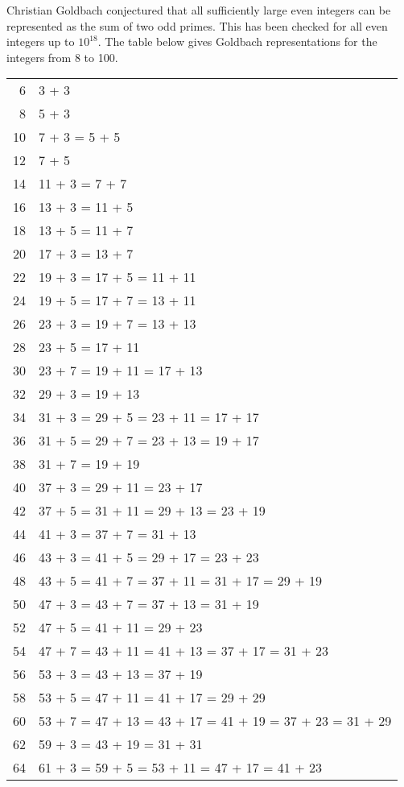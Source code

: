 \documentclass[12pt]{article}
\begin{document}
Christian Goldbach conjectured that all sufficiently large even integers can be represented as the sum of two odd primes. This has been checked for all even integers up to $10^{18}$. The table below gives Goldbach representations for the integers from 8 to 100.

\begin{tabular}{|r|l|}
6 & 3 + 3 \\
8 & 5 + 3 \\
10 & 7 + 3 = 5 + 5 \\
12 & 7 + 5 \\
14 & 11 + 3 = 7 + 7 \\
16 & 13 + 3 = 11 + 5 \\
18 & 13 + 5 = 11 + 7 \\
20 & 17 + 3 = 13 + 7 \\
22 & 19 + 3 = 17 + 5 = 11 + 11 \\
24 & 19 + 5 = 17 + 7 = 13 + 11 \\
26 & 23 + 3 = 19 + 7 = 13 + 13 \\
28 & 23 + 5 = 17 + 11 \\
30 & 23 + 7 = 19 + 11 = 17 + 13 \\
32 & 29 + 3 = 19 + 13 \\
34 & 31 + 3 = 29 + 5 = 23 + 11 = 17 + 17 \\
36 & 31 + 5 = 29 + 7 = 23 + 13 = 19 + 17 \\
38 & 31 + 7 = 19 + 19 \\
40 & 37 + 3 = 29 + 11 = 23 + 17 \\
42 & 37 + 5 = 31 + 11 = 29 + 13 = 23 + 19 \\
44 & 41 + 3 = 37 + 7 = 31 + 13 \\
46 & 43 + 3 = 41 + 5 = 29 + 17 = 23 + 23 \\
48 & 43 + 5 = 41 + 7 = 37 + 11 = 31 + 17 = 29 + 19 \\
50 & 47 + 3 = 43 + 7 = 37 + 13 = 31 + 19 \\
52 & 47 + 5 = 41 + 11 = 29 + 23 \\
54 & 47 + 7 = 43 + 11 = 41 + 13 = 37 + 17 = 31 + 23 \\
56 & 53 + 3 = 43 + 13 = 37 + 19 \\
58 & 53 + 5 = 47 + 11 = 41 + 17 = 29 + 29 \\
60 & 53 + 7 = 47 + 13 = 43 + 17 = 41 + 19 = 37 + 23 = 31 + 29 \\
62 & 59 + 3 = 43 + 19 = 31 + 31 \\
64 & 61 + 3 = 59 + 5 = 53 + 11 = 47 + 17 = 41 + 23 \\

\end{tabular}
\end{document}
